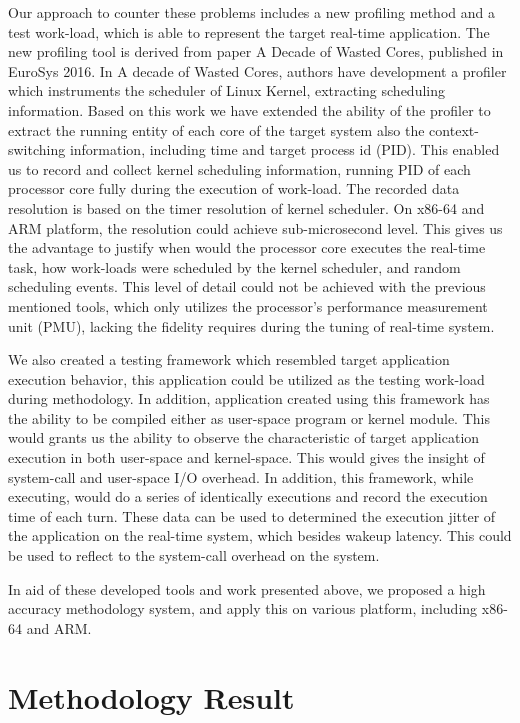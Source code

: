 \documentclass[10pt,a4paper]{article}
\begin{document}
\begin{multicols}{2}
    Our approach to counter these problems includes a new profiling method and a test work-load, which is able to
    represent the target real-time application. The new profiling tool is derived from paper A Decade of Wasted Cores,
    published in EuroSys 2016. In A decade of Wasted Cores, authors have development a profiler which instruments the
    scheduler of Linux Kernel, extracting scheduling information. Based on this work we have extended the ability of the
    profiler to extract the running entity of each core of the target system also the context-switching information,
    including time and target process id (PID). This enabled us to record and collect kernel scheduling information,
    running PID of each processor core fully during the execution of work-load. The recorded data resolution is based on
    the timer resolution of kernel scheduler. On x86-64 and ARM platform, the resolution could achieve sub-microsecond
    level. This gives us the advantage to justify when would the processor core executes the real-time task, how
    work-loads were scheduled by the kernel scheduler, and random scheduling events. This level of detail could not be
    achieved with the previous mentioned tools, which only utilizes the processor's performance measurement unit (PMU),
    lacking the fidelity requires during the tuning of real-time system.

    We also created a testing framework which resembled target application execution behavior, this application could be
    utilized as the testing work-load during methodology. In addition, application created using this framework has the
    ability to be compiled either as user-space program or kernel module. This would grants us the ability to observe
    the characteristic of target application execution in both user-space and kernel-space. This would gives the insight
    of system-call and user-space I/O overhead. In addition, this framework, while executing, would do a series of
    identically executions and record the execution time of each turn. These data can be used to determined the
    execution jitter of the application on the real-time system, which besides wakeup latency. This could be used to
    reflect to the system-call overhead on the system.

    In aid of these developed tools and work presented above, we proposed a high accuracy methodology system, and apply
    this on various platform, including x86-64 and ARM.
    

\section{Methodology Result}


\begin{thebibliography}{9}%
\end{thebibliography}

\end{multicols}
\end{document}
